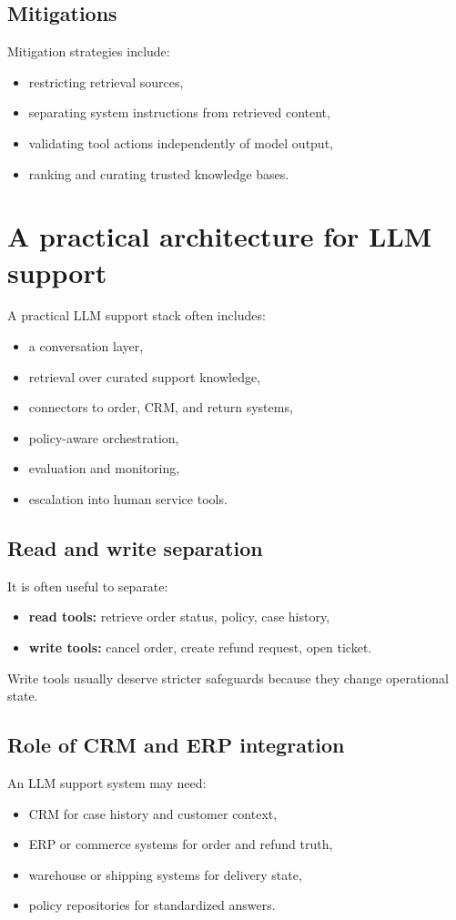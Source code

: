 \subsection{Mitigations}
Mitigation strategies include:
\begin{itemize}
  \item restricting retrieval sources,
  \item separating system instructions from retrieved content,
  \item validating tool actions independently of model output,
  \item ranking and curating trusted knowledge bases.
\end{itemize}

\section{A practical architecture for LLM support}
A practical LLM support stack often includes:
\begin{itemize}
  \item a conversation layer,
  \item retrieval over curated support knowledge,
  \item connectors to order, CRM, and return systems,
  \item policy-aware orchestration,
  \item evaluation and monitoring,
  \item escalation into human service tools.
\end{itemize}

\subsection{Read and write separation}
It is often useful to separate:
\begin{itemize}
  \item \textbf{read tools:} retrieve order status, policy, case history,
  \item \textbf{write tools:} cancel order, create refund request, open ticket.
\end{itemize}

Write tools usually deserve stricter safeguards because they change operational state.

\subsection{Role of CRM and ERP integration}
An LLM support system may need:
\begin{itemize}
  \item CRM for case history and customer context,
  \item ERP or commerce systems for order and refund truth,
  \item warehouse or shipping systems for delivery state,
  \item policy repositories for standardized answers.
\end{itemize}

